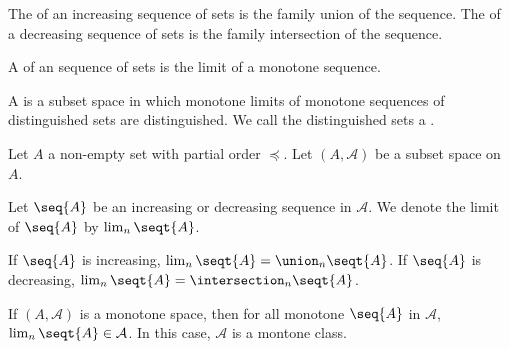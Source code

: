 
\sbasic














\sstart
{}





The
of an increasing sequence
of sets is the family
union of the sequence.
The
of a decreasing sequence
of sets is the family
intersection of the sequence.

A
of an sequence of sets
is the limit of a
monotone sequence.

A
is a
subset space in which
monotone limits of
 monotone sequences
of distinguished sets are distinguished.
We call the distinguished sets a
.


Let $A$ a non-empty set with
partial order $\preceq$.
Let $(A, \mathcal{A})$ be a
subset space on $A$.

Let $\seq{A}$ be an increasing
or decreasing sequence in $\mathcal{A}$.
We denote the limit of $\seq{A}$
by $\lim_{n} \seqt{A}$.

If $\seq{A}$ is increasing,
$\lim_n \seqt{A} = \union_{n} \seqt{A}$.
If $\seq{A}$ is decreasing,
$\lim_n \seqt{A} = \intersection_{n} \seqt{A}$.

If $(A, \mathcal{A})$ is a monotone space,
then for all monotone
$\seq{A}$ in $\mathcal{A}$,
$\lim_{n} \seqt{A} \in \mathcal{A}$.
In this case, $\mathcal{A}$ is a montone class.
\strats
